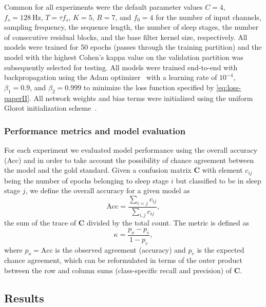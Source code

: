 Common for all experiments were the default parameter values $C=4$, $f_s=\SI{128}{\hertz}$, $T=\tau f_s$, $K=5$, $R=7$, and $f_0=4$ for the number of input channels, sampling frequency, the sequence length, the number of sleep stages, the number of consecutive residual blocks, and the base filter kernel size, respectively.
All models were trained for 50 epochs (passes through the training partition) and the model with the highest Cohen’s kappa value on the validation partition was subsequently selected for testing.
All models were trained end-to-end with backpropagation using the Adam optimizer~\cite{Kingma2015} with a learning rate of $10^{-4}$, $\beta_1=0.9$, and $\beta_2=0.999$ to minimize the loss function specified by \cref{eq:loss-paperII}. 
All network weights and bias terms were initialized using the uniform Glorot initialization scheme~\cite{Glorot2010}. 

\subsubsection{Performance metrics and model evaluation}
For each experiment we evaluated model performance using the overall accuracy (Acc) and \cohen in order to take account the possibility of chance agreement between the model and the gold standard.
Given a confusion matrix $\mathbf{C}$ with element $c_{ij}$ being the number of epochs belonging to sleep stage $i$ but classified to be in sleep stage $j$, we define the overall accuracy for a given model as
\begin{equation}
    \text{Acc} = \frac{\sum_{i=j}c_{ij}}{\sum_{i,j}c_{ij}},
\end{equation}
\ie the sum of the trace of $\mathbf{C}$ divided by the total count.
The \cohen metric is defined as
\begin{equation}
    \kappa = \frac{p_o - p_e}{1 - p_e},
\end{equation}
where $p_o = \text{Acc}$ is the observed agreement (\ie accuracy) and $p_e$ is the expected chance agreement, which can be reformulated in terms of the outer product between the row and column sums (class-specific recall and precision) of $\mathbf{C}$.


\subsection{Results}

